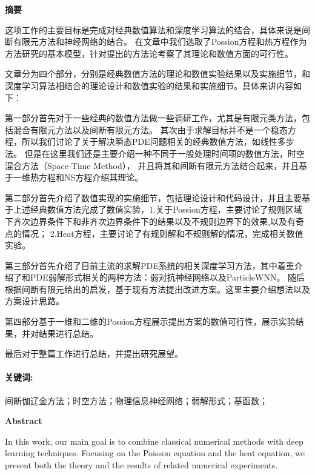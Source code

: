 \cleardoublepage{}
\begin{center}
    \bfseries {} 摘要
\end{center}

这项工作的主要目标是完成对经典数值算法和深度学习算法的结合，具体来说是间断有限元方法和神经网络的结合。
在文章中我们选取了Possion方程和热方程作为方法研究的基本模型，针对提出的方法论考察了其理论和数值方面的可行性。

文章分为四个部分，分别是经典数值方法的理论和数值实验结果以及实施细节，和深度学习算法相结合的理论设计和数值实验的结果和实施细节。具体来讲内容如下：

第一部分首先对于一些经典的数值方法做一些调研工作，尤其是有限元类方法，包括混合有限元方法以及间断有限元方法。
其次由于求解目标并不是一个稳态方程，所以我们讨论了关于解决瞬态PDE问题相关的经典数值方法，如线性多步法。
但是在这里我们还是主要介绍一种不同于一般处理时间项的数值方法，时空混合方法（Space-Time Method），
并且将其和间断有限元方法结合起来，并且基于一维热方程和NS方程介绍其理论。

第二部分首先介绍了数值实现的实施细节，包括理论设计和代码设计，并且主要基于上述经典数值方法完成了数值实验，1.关于Possion方程，主要讨论了规则区域下齐次边界条件下和非齐次边界条件下的结果以及不规则边界下的效果,以及有奇点的情况；
2.Heat方程，主要讨论了有规则解和不规则解的情况，完成相关数值实验。

第三部分首先介绍了目前主流的求解PDE系统的相关深度学习方法，其中着重介绍了和PDE弱解形式相关的两种方法：弱对抗神经网络以及ParticleWNN。
随后根据间断有限元给出的启发，基于现有方法提出改进方案。这里主要介绍想法以及方案设计思路。

第四部分基于一维和二维的Possion方程展示提出方案的数值可行性，展示实验结果，并对结果进行总结。

最后对于整篇工作进行总结，并提出研究展望。

\paragraph*{关键词:}间断伽辽金方法；时空方法；物理信息神经网络；弱解形式；基函数；

\cleardoublepage{}
\begin{center}
    \bfseries {} Abstract
\end{center}

In this work, our main goal is to combine classical numerical methods with deep learning techniques. Focusing on the Poisson equation and the heat equation, we present both the theory and the results of related numerical experiments.

